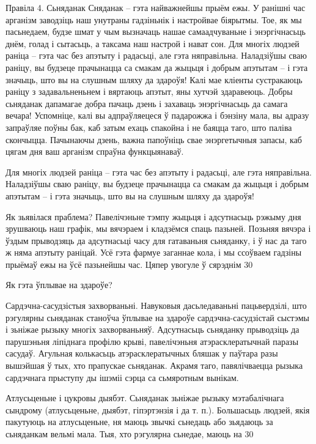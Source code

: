 Правіла 4. Сьняданак
Сняданак – гэта найважнейшы прыём ежы. У ранішні час арганізм заводзіць наш унутраны гадзіньнік і настройвае біярытмы. Тое, як мы пасьнедаем, будзе шмат у чым вызначаць нашае самаадчуваньне і энэргічнасьць днём, голад і сытасьць, а таксама наш настрой і нават сон. Для многіх людзей раніца – гэта час без апэтыту і радасьці, але гэта няправільна. Наладзіўшы сваю раніцу, вы будзеце прачынацца са смакам да жыцьця і добрым апэтытам – і гэта значыць, што вы на слушным шляху да здароўя! Калі мае кліенты сустракаюць раніцу з задавальненьнем і вяртаюць апэтыт, яны хутчэй здаравеюць.
Добры сьняданак дапамагае добра пачаць дзень і захаваць энэргічнасьць да самага вечара! Успомніце, калі вы адпраўляецеся ў падарожжа і бэнзіну мала, вы адразу запраўляе поўны бак, каб затым ехаць спакойна і не баяцца таго, што паліва скончыцца. Пачынаючы дзень, важна папоўніць свае энэргетычныя запасы, каб цягам дня ваш арганізм спраўна функцыянаваў.

Для многіх людзей раніца – гэта час без апэтыту і радасьці, але гэта няправільна. Наладзіўшы сваю раніцу, вы будзеце прачынацца са смакам да жыцьця і добрым апэтытам – і гэта значыць, што вы на слушным шляху да здароўя!

Як зьявілася праблема?
Павелічэньне тэмпу жыцьця і адсутнасьць рэжыму дня зрушваюць наш графік, мы вячэраем і кладзёмся спаць пазьней. Позьняя вячэра і ўздым прыводзяць да адсутнасьці часу для гатаваньня сьняданку, і ў нас да таго ж няма апэтыту раніцай. Усё гэта фармуе заганнае кола, і мы ссоўваем гадзіны прыёмаў ежы на ўсё пазьнейшы час. Цяпер увогуле ў сярэднім 30%

Як гэта ўплывае на здароўе?

Сардэчна-сасудзістыя захворваньні.
Навуковыя дасьледаваньні пацьвердзілі, што рэгулярны сьняданак станоўча ўплывае на здароўе сардэчна-сасудзістай сыстэмы і зьніжае рызыку многіх захворваньняў. Адсутнасьць сьняданку прыводзіць да парушэньня ліпіднага профілю крыві, павелічэньня атэрасклератычнай паразы сасудаў. Агульная колькасьць атэрасклератычных бляшак у паўтара разы вышэйшая ў тых, хто прапускае сьняданак. Акрамя таго, павялічваецца рызыка сардэчнага прыступу ды ішэміі сэрца са сьмяротным вынікам.

Атлусьценьне і цукровы дыябэт.
Сьняданак зьніжае рызыку мэтабалічнага сындрому (атлусьценьне, дыябэт, гіпэртэнзія і да т. п.). Большасьць людзей, якія пакутуюць на атлусьценьне, ня маюць звычкі сьнедаць або зьядаюць за сьняданкам вельмі мала. Тыя, хто рэгулярна сьнедае, маюць на 30%

